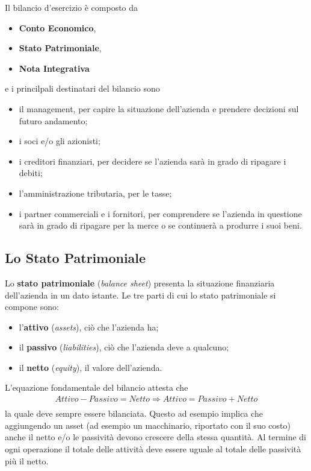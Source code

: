 \documentclass[a4paper,portrait,12pt]{article}
\theoremstyle{definition}
\begin{document}
Il bilancio d'esercizio è composto da
\begin{itemize}
\item \textbf{Conto Economico},
\item \textbf{Stato Patrimoniale},
\item \textbf{Nota Integrativa}
\end{itemize}
e i princilpali destinatari del bilancio sono
\begin{itemize}
\item il management, per capire la situazione dell'azienda e prendere decizioni sul futuro andamento;
\item i soci e/o gli azionisti;
\item i creditori finanziari, per decidere se l'azienda sarà in grado di ripagare i debiti;
\item l'amministrazione tributaria, per le tasse;
\item i partner commerciali e i fornitori, per comprendere se l'azienda in questione sarà in grado di ripagare per la merce o se continuerà a produrre i suoi beni.
\end{itemize}

\subsection{Lo Stato Patrimoniale}

Lo \textbf{stato patrimoniale} (\emph{balance sheet}) presenta la situazione finanziaria dell'azienda in un dato istante.
Le tre parti di cui lo stato patrimoniale si compone sono:
\begin{itemize}
\item l'\textbf{attivo} (\emph{assets}), ciò che l'azienda ha;
\item il \textbf{passivo} (\emph{liabilities}), ciò che l'azienda deve a qualcuno;
\item il \textbf{netto} (\emph{equity}), il valore dell'azienda.
\end{itemize}
L'equazione fondamentale del bilancio attesta che
\begin{align*}
Attivo - Passivo = Netto \Rightarrow Attivo = Passivo + Netto\\
\end{align*}
la quale deve sempre essere bilanciata.
Questo ad esempio implica che aggiungendo un asset (ad esempio un macchinario, riportato con il suo costo) anche il netto e/o le passività devono crescere della stessa quantità.
Al termine di ogni operazione il totale delle attività deve essere uguale al totale delle passività più il netto.
\end{document}
